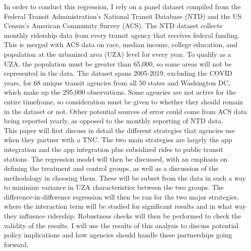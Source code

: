 \documentclass [11pt]{article}
\begin{document}

\indent In order to conduct this regression, I rely on a panel dataset compiled from the Federal Transit Administration's National Transit Database (NTD) and the US Census's American Community Survey (ACS). The NTD dataset collects monthly ridership data from every transit agency that receives federal funding. This is merged with ACS data on race, median income, college education, and population at the urbanized area (UZA) level for every year. To qualify as a UZA, the population must be greater than 65,000, so some areas will not be represented in the data. The dataset spans 2005-2019, excluding the COVID years, for 68 unique transit agencies from all 50 states and Washington DC, which make up the 295,000 observations. Some agencies are not active for the entire timeframe, so consideration must be given to whether they should remain in the dataset or not. Other potential sources of error could come from ACS data being reported yearly, as opposed to the monthly reporting of NTD data.\\


\indent This paper will first discuss in detail the different strategies that agencies use when they partner with a TNC. The two main strategies are largely the app integration and the app integration plus subsidized rides to public transit stations. The regression model will then be discussed, with an emphasis on defining the treatment and control groups, as well as a discussion of the methodology in choosing them. These will be subset from the data in such a way to minimize variance in UZA characteristics between the two groups. The difference-in-difference regression will then be ran for the two major strategies, where the interaction term will be studied for significant results and in what way they influence ridership. Robustness checks will then be performed to check the validity of the results. I will use the results of this analysis to discuss potential policy implications and how agencies should handle these partnerships going forward.


\nocite{*}
\newpage


\end{document}
